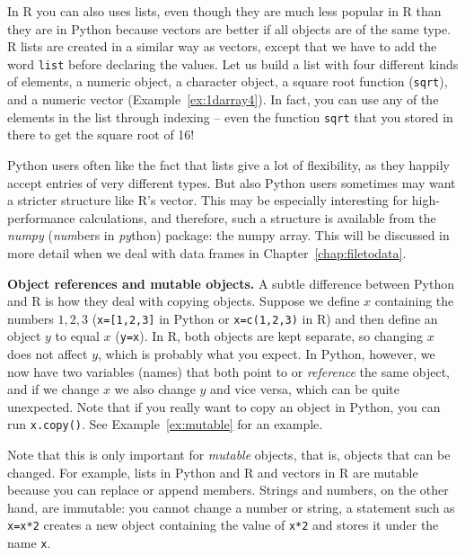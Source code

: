 In R you can also uses lists, even though they are much less popular in R than
they are in Python because vectors are better if all objects are of the same type.
R lists are created in a similar way as vectors, except that we have to add the word \verb|list|
before declaring the values. Let us build a list with four different
kinds of elements, a numeric object, a character object, a square root
function (\texttt{sqrt}), and a numeric vector (Example~\ref{ex:1darray4}). In fact, you
can use any of the elements in the list through indexing -- even the
function \texttt{sqrt} that you stored in there to get the square root of
16!


Python users often like the fact that lists give  a lot of flexibility, as they happily accept
entries of very different types. But also Python users sometimes may want a stricter
structure like R's vector. This may be especially interesting for
high-performance calculations, and therefore, such a structure is
available from the \emph{numpy} (\emph{num}bers in \emph{py}thon)
package: the numpy array.
This will be discussed in more detail when we deal with data frames in Chapter~\ref{chap:filetodata}.


\begin{feature}\textbf{Object references and mutable objects.}
  A subtle difference between Python and R is how they deal with copying objects.
  Suppose we define $x$ containing the numbers $1,2,3$ (\verb|x=[1,2,3]| in Python or \verb|x=c(1,2,3)| in R)
  and then define an object $y$ to equal $x$ (\verb|y=x|).
  In R, both objects are kept separate, so changing $x$ does not affect $y$,
  which is probably what you expect.
  In Python, however, we now have two variables (names) that both point to or \emph{reference} the same object,
  and if we change $x$ we also change $y$ and vice versa, which can be quite unexpected.
  Note that if you really want to copy an object in Python, you can run \verb|x.copy()|.
  See Example~\ref{ex:mutable} for an example.

  Note that this is only important for \emph{mutable} objects, that is,
  objects that can be changed.
  For example, lists in Python and R and vectors in R are mutable because you can replace or append members.
  Strings and numbers, on the other hand, are immutable:
  you cannot change a number or string, a statement such as \verb|x=x*2| creates a new object containing the value of \verb|x*2| and stores it under the name \verb|x|.

\end{feature}
  
